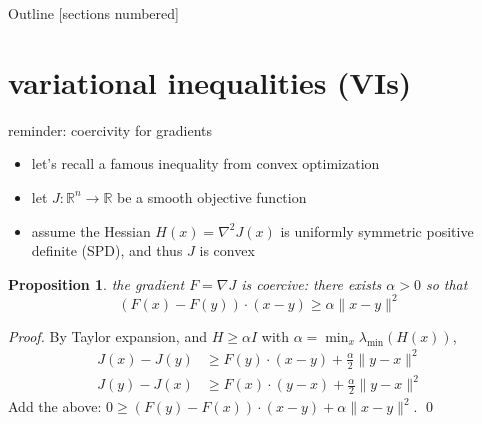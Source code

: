 \documentclass[10pt,svgnames]{beamer}
\newtheorem*{proposition}{Proposition}
\newcommand{\RR}{\mathbb{R}}
\newcommand{\grad}{\nabla}
\newcommand{\aler}[1]{{\color{FireBrick} #1}}
\begin{document}
\begin{frame}{Outline}
  [sections numbered]
  \tableofcontents[hideallsubsections]
\end{frame}

\AtBeginSection[]
{%
}


\section{variational inequalities (VIs)}

\begin{frame}{reminder: coercivity for gradients}

\begin{itemize}
\item let's recall a famous inequality from convex optimization
\item let $J: \RR^n \to \RR$ be a smooth objective function
\item assume the Hessian $H(x)=\grad^2 J(x)$ is uniformly symmetric positive definite (SPD), and thus $J$ is convex
\end{itemize}

\bigskip
\begin{proposition}
the gradient $F=\nabla J$ is \aler{coercive}: there exists $\alpha > 0$ so that
$$(F(x) - F(y)) \cdot (x - y) \ge \alpha \|x - y\|^2$$
\end{proposition}

\emph{Proof.} By Taylor expansion, and $H \ge \alpha I$ with $\alpha=\min_{x} \lambda_{\text{min}}(H(x))$,
\begin{align*}
J(x) - J(y) &\ge F(y) \cdot (x - y) + \frac{\alpha}{2} \|y-x\|^2 \\
J(y) - J(x) &\ge F(x) \cdot (y - x) + \frac{\alpha}{2} \|y-x\|^2
\end{align*}
Add the above: \quad $0 \ge (F(y) - F(x)) \cdot (x-y) +  \alpha \|x - y\|^2$. \qed
\end{frame}
\end{document}
